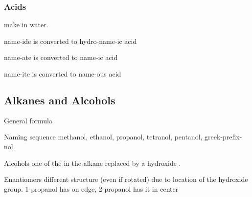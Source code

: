 \begin{mdframed}
\begin{multicols}{2}
    \subsubsection{Acids} make  in water.
    \begin{compactdesc}
    \item[name-ide is converted to] hydro-name-ic acid
    \item[name-ate] is converted to name-ic acid
    \item[name-ite] is converted to name-ous acid
    \end{compactdesc}
\end{multicols}
\end{mdframed}





\begin{mdframed}
\subsection{Alkanes and Alcohols}
\begin{multicols}{2}
\begin{compactdesc}
\item[General formula] 
\item[Naming sequence] methanol, ethanol, propanol, tetranol, pentanol,
    greek-prefix-nol.
\item[Alcohols] one of the  in the alkane replaced by a hydroxide
    .
\item[Enantiomers] different structure (even if rotated) due to location of the
    hydroxide group. 1-propanol has  on edge, 2-propanol has it in
    center
\end{compactdesc}
\end{multicols}
\end{mdframed}






